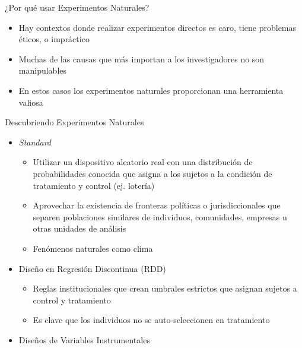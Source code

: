 \documentclass[
  ignorenonframetext,
]{beamer}
\providecommand{\tightlist}{%
  \setlength{\itemsep}{0pt}\setlength{\parskip}{0pt}}
\begin{document}
\begin{frame}{¿Por qué usar Experimentos Naturales?}
\protect\hypertarget{por-quuxe9-usar-experimentos-naturales}{}
\begin{itemize}
\tightlist
\item
  Hay contextos donde realizar experimentos directos es caro, tiene
  problemas éticos, o impráctico
\item
  Muchas de las causas que más importan a los investigadores no son
  manipulables
\item
  En estos casos los experimentos naturales proporcionan una herramienta
  valiosa
\end{itemize}
\end{frame}

\begin{frame}{Descubriendo Experimentos Naturales}
\protect\hypertarget{descubriendo-experimentos-naturales}{}
\begin{itemize}
\tightlist
\item
  \textit{Standard}

  \begin{itemize}
  \tightlist
  \item
    Utilizar un dispositivo aleatorio real con una distribución de
    probabilidades conocida que asigna a los sujetos a la condición de
    tratamiento y control (ej. lotería)
  \item
    Aprovechar la existencia de fronteras políticas o jurisdiccionales
    que separen poblaciones similares de individuos, comunidades,
    empresas u otras unidades de análisis
  \item
    Fenómenos naturales como clima
  \end{itemize}
\item
  Diseño en Regresión Discontinua (RDD)

  \begin{itemize}
  \tightlist
  \item
    Reglas institucionales que crean umbrales estrictos que asignan
    sujetos a control y tratamiento
  \item
    Es clave que los individuos no se auto-seleccionen en tratamiento
  \end{itemize}
\item
  Diseños de Variables Instrumentales
\end{itemize}
\end{frame}
\end{document}
